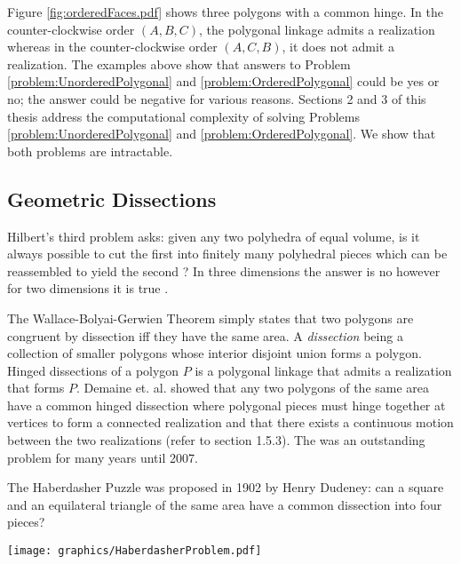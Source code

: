 Figure \ref{fig:orderedFaces.pdf} shows three polygons with a common hinge.
In the counter-clockwise order $(A,B,C)$, the polygonal linkage admits a realization whereas in the counter-clockwise order $(A,C,B)$, it does not admit a realization.
The examples above show that answers to Problem \ref{problem:UnorderedPolygonal} and \ref{problem:OrderedPolygonal} could be yes or no; the answer could be negative for various reasons.
Sections 2 and 3 of this thesis address the computational complexity of solving Problems \ref{problem:UnorderedPolygonal} and \ref{problem:OrderedPolygonal}.
We show that both problems are intractable.




\subsection{Geometric Dissections}
Hilbert's third problem asks: given any two polyhedra of equal volume, is it always possible to cut the first into finitely many polyhedral pieces which can be reassembled to yield the second \cite{aigner2010hilbert}?  
In three dimensions the answer is no however for two dimensions it is true \cite{10.23073621846}.

The Wallace-Bolyai-Gerwien Theorem simply states that two polygons are congruent by dissection iff they have the same area.  
A \textit{dissection} being a collection of smaller polygons whose interior disjoint union forms a polygon.
Hinged dissections of a polygon $P$ is a polygonal linkage that admits a realization that forms $P$.  
Demaine et. al. \cite{abbott2012hinged} showed that any two polygons of the same area have a common hinged dissection where polygonal pieces must hinge together at vertices to form a connected realization and that there exists a continuous motion between the two realizations (refer to section 1.5.3).
The was an outstanding problem for many years until 2007.

The Haberdasher Puzzle was proposed in 1902 by Henry Dudeney: can a square and an equilateral triangle of the same area have a common dissection into four pieces? 

\begin{minipage}{\linewidth}
\begin{center}
\texttt{[image: graphics/HaberdasherProblem.pdf]}
\end{center}
\label{fig:polygonallinkage-5}
\end{minipage}

